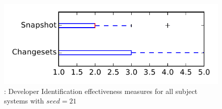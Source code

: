 
\begin{figure}
\centering
\includegraphics[height=0.4\textheight]{figures/dit_seed/rq1_tiny_21}
\caption{\rtwo: Developer Identification effectiveness measures for all subject systems with $seed=21$}
\label{fig:dit_seed:rq1:tiny}
\end{figure}
